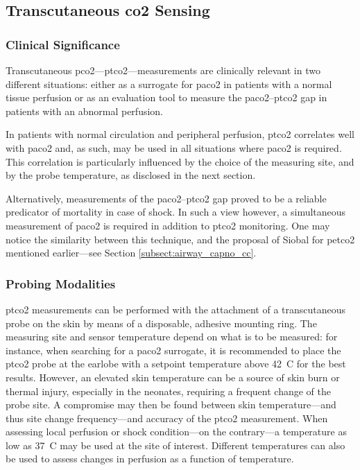 \subsection{Transcutaneous \texorpdfstring{\gls{co2}}{CO2} Sensing}\label{subsect:transcut_capno}

\subsubsection{Clinical Significance}

Transcutaneous \gls{pco2}---\gls{ptco2}---measurements are clinically relevant in two different situations: either as a surrogate for \gls{paco2} in patients with a normal tissue perfusion or as an evaluation tool to measure the \gls{paco2}--\gls{ptco2} gap in patients with an abnormal perfusion\cite{mari2019}.

In patients with normal circulation and peripheral perfusion, \gls{ptco2} correlates well with \gls{paco2} and, as such, may be used in all situations where \gls{paco2} is required\cite{conway2018}. This correlation is particularly influenced by the choice of the measuring site, and by the probe temperature, as disclosed in the next section.

Alternatively, measurements of the \gls{paco2}--\gls{ptco2} gap proved to be a reliable predicator of mortality in case of shock\cite{vallee2019}. In such a view however, a simultaneous measurement of \gls{paco2} is required in addition to \gls{ptco2} monitoring. One may notice the similarity between this technique, and the proposal of Siobal \etal{} for \gls{petco2} mentioned earlier---see Section \ref{subsect:airway_capno_cc}.

\subsubsection{Probing Modalities}

\gls{ptco2} measurements can be performed with the attachment of a transcutaneous probe on the skin by means of a disposable, adhesive mounting ring. The measuring site and sensor temperature depend on what is to be measured: for instance, when searching for a \gls{paco2} surrogate, it is recommended to place the \gls{ptco2} probe at the earlobe with a setpoint temperature above 42~{\degree}C for the best results\cite{conway2018}. However, an elevated skin temperature can be a source of skin burn or thermal injury, especially in the neonates, requiring a frequent change of the probe site\cite{fanconi1996}. A compromise may then be found between skin temperature---and thus site change frequency---and accuracy of the \gls{ptco2} measurement\cite{restrepo2012}. When assessing local perfusion or shock condition---on the contrary---a temperature as low as 37~{\degree}C may be used at the site of interest\cite{vallee2010}. Different temperatures can also be used to assess changes in perfusion as a function of temperature\cite{vallee2019}.

